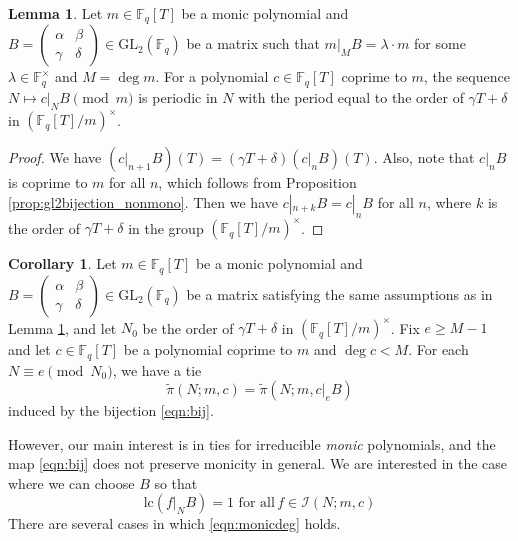 \documentclass[10pt,reqno]{amsproc}
\newcommand{\GL}{\mathrm{GL}}
\newcommand{\lc}{\mathrm{lc}}
\newcommand{\bF}{\mathbb{F}}
\newcommand{\cI}{\mathcal{I}}
\newcommand{\1}{\mathds{1}}	%
\theoremstyle{definition}
\newtheorem{lemma}[theorem]{Lemma}
\newtheorem{corollary}[theorem]{Corollary}
\theoremstyle{remark}
\begin{document}
\begin{lemma}
\label{lem:action_period}
    Let $m \in \bF_q[T]$ be a monic polynomial and $B = \left(\begin{smallmatrix} \alpha & \beta \\ \gamma & \delta \end{smallmatrix} \right) \in \GL_2(\bF_q)$ be a matrix such that $m|_{M} B = \lambda \cdot m$ for some $\lambda \in \bF_q^\times$ and $M = \deg m$.
    For a polynomial $c \in \bF_q[T]$ coprime to $m$, the sequence $N \mapsto c|_N B \pmod{m}$ is periodic in $N$ with the period equal to the order of $\gamma T + \delta$ in $(\bF_q[T] / m)^\times$.
\end{lemma}
\begin{proof}
    We have $(c|_{n+1} B)(T) = (\gamma T + \delta) (c|_{n} B)(T)$.
    Also, note that $c|_n B$ is coprime to $m$ for all $n$, which follows from Proposition \ref{prop:gl2bijection_nonmono}.
    Then we have $c|_{n + k} B = c|_{n} B$ for all $n$, where $k$ is the order of $\gamma T + \delta$ in the group $(\bF_q[T] / m)^\times$.
\end{proof}

\begin{corollary}
\label{cor:tie_periodic}
Let $m \in \bF_q[T]$ be a monic polynomial and $B = \left(\begin{smallmatrix}
    \alpha & \beta \\ \gamma & \delta
\end{smallmatrix}\right) \in \GL_2(\bF_q)$ be a matrix satisfying the same assumptions as in Lemma \ref{lem:action_period}, and let $N_0$ be the order of $\gamma T + \delta$ in $(\bF_q[T] / m)^\times$.
Fix $e \ge M - 1$ and let $c \in \bF_q[T]$ be a polynomial coprime to $m$ and $\deg c < M$.
For each $N \equiv e \pmod{N_0}$, we have a tie
\[
\widetilde{\pi}(N; m, c) = \widetilde{\pi}(N; m, c|_{e} B)
\]
induced by the bijection \eqref{eqn:bij}.
\end{corollary}




However, our main interest is in ties for irreducible \emph{monic} polynomials, and the map \eqref{eqn:bij} does not preserve monicity in general.
We are interested in the case where we can choose $B$ so that
\begin{equation}
    \label{eqn:monicdeg}
    \lc(f|_N B) = 1 \,\,\text{for all}\,f \in \cI(N; m, c)
\end{equation}
There are several cases in which \eqref{eqn:monicdeg} holds.
\end{document}
